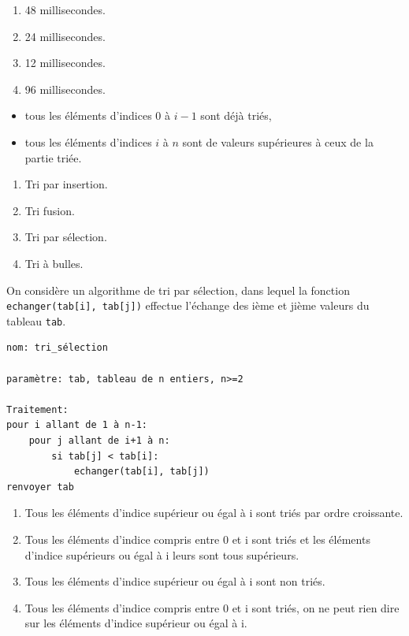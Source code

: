\begin{lstlisting}
\end{lstlisting}
\begin{enumerate}
\item 48 millisecondes. %
\item 24 millisecondes.
\item 12 millisecondes.
\item 96 millisecondes.
\end{enumerate}

\begin{itemize}
\item tous les éléments d'indices 0 à $i-1$ sont déjà triés,
\item tous les éléments d'indices $i$ à $n$ sont de valeurs supérieures à ceux de la partie triée.
\end{itemize}
\begin{enumerate}
\item Tri par insertion. 
\item Tri fusion.
\item Tri par sélection. %
\item Tri à bulles.
\end{enumerate}


On considère un algorithme de tri par sélection, dans lequel la fonction \texttt{echanger(tab[i], tab[j])}
effectue l'échange des ième et jième valeurs du tableau \texttt{tab}.
\begin{lstlisting}
nom: tri_sélection

paramètre: tab, tableau de n entiers, n>=2

Traitement:
pour i allant de 1 à n-1:
    pour j allant de i+1 à n:
        si tab[j] < tab[i]:
            echanger(tab[i], tab[j])
renvoyer tab
\end{lstlisting}
\begin{enumerate}
\item Tous les éléments d'indice supérieur ou égal à i sont triés par ordre croissante.
\item Tous les éléments d'indice compris entre 0 et i sont triés et les éléments d'indice supérieurs ou égal à i leurs sont tous supérieurs.
\item Tous les éléments d'indice supérieur ou égal à i sont non triés.
\item Tous les éléments d'indice compris entre 0 et i sont triés, on ne peut rien dire sur les éléments d'indice supérieur ou égal à i.
\end{enumerate}

